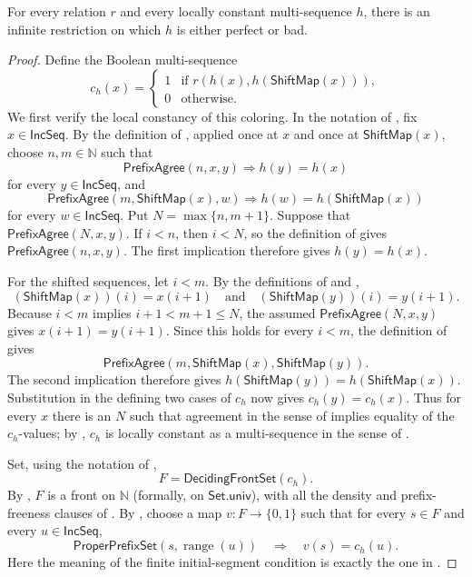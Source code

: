 \begin{lemma}
For every relation $r$ and every locally constant multi-sequence $h$, there
is an infinite restriction on which $h$ is either perfect or bad.
\end{lemma}
\begin{proof}
Define the Boolean multi-sequence
\[
c_h(x)=\begin{cases}1&\text{if }r(h(x),h(\mathsf{ShiftMap}(x))),\\
0&\text{otherwise.}\end{cases}
\]
We first verify the local constancy of this coloring.  In the notation of
, fix $x\in\mathsf{IncSeq}$.  By the definition of
, applied once at $x$ and once at
$\mathsf{ShiftMap}(x)$, choose $n,m\in\mathbb N$ such that
\[
 \mathsf{PrefixAgree}(n,x,y)\Longrightarrow h(y)=h(x)
\]
for every $y\in\mathsf{IncSeq}$, and
\[
 \mathsf{PrefixAgree}(m,\mathsf{ShiftMap}(x),w)
 \Longrightarrow h(w)=h(\mathsf{ShiftMap}(x))
\]
for every $w\in\mathsf{IncSeq}$.  Put
$N=\max\{n,m+1\}$.  Suppose that
$\mathsf{PrefixAgree}(N,x,y)$.  If $i<n$, then $i<N$, so the definition of
 gives $\mathsf{PrefixAgree}(n,x,y)$.  The first
implication therefore gives $h(y)=h(x)$.

For the shifted sequences, let $i<m$.  By the definitions of
 and ,
\[
 (\mathsf{ShiftMap}(x))(i)=x(i+1)
 \quad\text{and}\quad
 (\mathsf{ShiftMap}(y))(i)=y(i+1).
\]
Because $i<m$ implies $i+1<m+1\leq N$, the assumed
$\mathsf{PrefixAgree}(N,x,y)$ gives $x(i+1)=y(i+1)$.  Since this holds for
every $i<m$, the definition of  gives
\[
 \mathsf{PrefixAgree}(m,\mathsf{ShiftMap}(x),\mathsf{ShiftMap}(y)).
\]
The second implication therefore gives
$h(\mathsf{ShiftMap}(y))=h(\mathsf{ShiftMap}(x))$.  Substitution in the
defining two cases of $c_h$ now gives $c_h(y)=c_h(x)$.  Thus for every $x$
there is an $N$ such that agreement in the sense of
 implies equality of the $c_h$-values; by
, $c_h$ is locally constant as a multi-sequence in
the sense of .

Set, using the notation of ,
\[
 F=\mathsf{DecidingFrontSet}(c_h).
\]
By , $F$ is a front on $\mathbb N$ (formally, on
$\mathsf{Set.univ}$), with all the density and prefix-freeness clauses of
.  By , choose a map
$v:F\to\{0,1\}$ such that for every $s\in F$ and every
$u\in\mathsf{IncSeq}$,
\[
 \mathsf{ProperPrefixSet}(s,\operatorname{range}(u))
 \quad\Longrightarrow\quad v(s)=c_h(u).
 \tag{1}
\]
Here the meaning of the finite initial-segment condition is exactly the one
in .


\end{proof}
